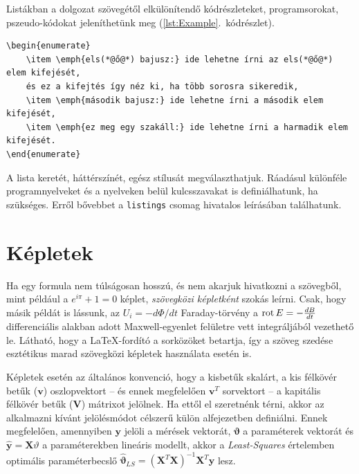 Listákban a dolgozat szövegétől elkülönítendő kódrészleteket, programsorokat, pszeudo-kódokat jeleníthetünk meg (\ref{lst:Example}.~kódrészlet).
\begin{lstlisting}[caption=A fenti számozott felsorolás \LaTeX-forráskódja,label=lst:Example]
\begin{enumerate}
	\item \emph{els(*@ő@*) bajusz:} ide lehetne írni az els(*@ő@*) elem kifejését,
	és ez a kifejtés így néz ki, ha több sorosra sikeredik,
	\item \emph{második bajusz:} ide lehetne írni a második elem kifejését,
	\item \emph{ez meg egy szakáll:} ide lehetne írni a harmadik elem kifejését.
\end{enumerate}
\end{lstlisting}
A lista keretét, háttérszínét, egész stílusát megválaszthatjuk. Ráadásul különféle programnyelveket és a nyelveken belül kulcsszavakat is definiálhatunk, ha szükséges. Erről bővebbet a \verb+listings+ csomag hivatalos leírásában találhatunk.

\section{Képletek}
Ha egy formula nem túlságosan hosszú, és nem akarjuk hivatkozni a szövegből, mint például a $e^{i\pi}+1=0$ képlet, \emph{szövegközi képletként} szokás leírni. Csak, hogy másik példát is lássunk, az $U_i=-d\Phi/dt$ Faraday-törvény a $\operatorname{rot} E=-\frac{dB}{dt}$ differenciális alakban adott Maxwell-egyenlet felületre vett integráljából vezethető le. Látható, hogy a \LaTeX-fordító a sorközöket betartja, így a szöveg szedése esztétikus marad szövegközi képletek használata esetén is.

Képletek esetén az általános konvenció, hogy a kisbetűk skalárt, a kis félkövér betűk ($\mathbf{v}$) oszlopvektort -- és ennek megfelelően $\mathbf{v}^T$ sorvektort -- a kapitális félkövér betűk ($\mathbf{V}$) mátrixot jelölnek. Ha ettől el szeretnénk térni, akkor az alkalmazni kívánt jelölésmódot célszerű külön alfejezetben definiálni. Ennek megfelelően, amennyiben $\mathbf{y}$ jelöli a mérések vektorát, $\mathbf{\vartheta}$ a paraméterek vektorát és $\hat{\mathbf{y}}=\mathbf{X}\vartheta$ a paraméterekben lineáris modellt, akkor a \emph{Least-Squares} értelemben optimális paraméterbecslő $\hat{\mathbf{\vartheta}}_{LS}=(\mathbf{X}^T\mathbf{X})^{-1}\mathbf{X}^T\mathbf{y}$ lesz.

